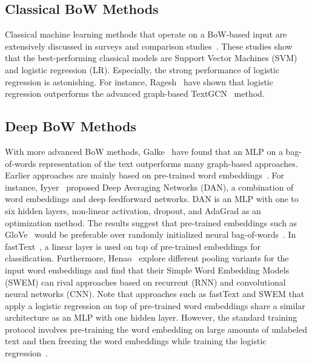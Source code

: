 \subsection{Classical BoW Methods}

Classical machine learning methods that operate on a BoW-based input are extensively discussed in surveys and comparison studies~\cite{
DBLP:conf/wsdm/RageshSIBL21,
DBLP:journals/information/KowsariMHMBB19,
DBLP:journals/air/Kadhim19,
DBLP:conf/kcap/GalkeMSBS17}.
These studies show that the best-performing classical models are Support Vector Machines (SVM) and logistic regression (LR).
Especially, the strong performance of logistic regression is astonishing.
For instance, Ragesh~\etal\cite{DBLP:conf/wsdm/RageshSIBL21} have shown that logistic regression outperforms the advanced graph-based TextGCN~\cite{DBLP:conf/aaai/YaoM019} method. 

\subsection{Deep BoW Methods}

With more advanced BoW methods, Galke~\etal\cite{DBLP:conf/kcap/GalkeMSBS17} have found that an MLP on a bag-of-words representation of the text outperforms many graph-based approaches.
Earlier approaches are mainly based on pre-trained word embeddings~\cite{DBLP:conf/nips/MikolovSCCD13,DBLP:conf/emnlp/PenningtonSM14}.
For instance, Iyyer~\etal\cite{DBLP:conf/acl/IyyerMBD15} proposed Deep Averaging Networks (DAN), a combination of word embeddings and deep feedforward networks.
DAN is an MLP with one to six hidden layers, non-linear activation, dropout, and AdaGrad as an optimization method.
The results suggest that pre-trained embeddings such as GloVe~\cite{DBLP:conf/emnlp/PenningtonSM14} would be preferable over randomly initialized neural bag-of-words~\cite{DBLP:conf/acl/KalchbrennerGB14}.
In fastText~\cite{DBLP:journals/tacl/BojanowskiGJM17,DBLP:conf/eacl/GraveMJB17}, a linear layer is used on top of pre-trained embeddings for classification.
Furthermore, Henao~\etal\cite{DBLP:conf/acl/HenaoLCSSWWMZ18} explore different pooling variants for the input word embeddings and find that their Simple Word Embedding Models (SWEM) can rival approaches based on recurrent (RNN) and convolutional neural networks (CNN).
Note that approaches such as fastText and SWEM that apply a logistic regression on top of pre-trained word embeddings share a similar architecture as an MLP with one hidden layer. 
However, the standard training protocol involves pre-training the word embedding on large amounts of unlabeled text and then freezing the word embeddings while training the logistic regression~\cite{DBLP:conf/nips/MikolovSCCD13}.

